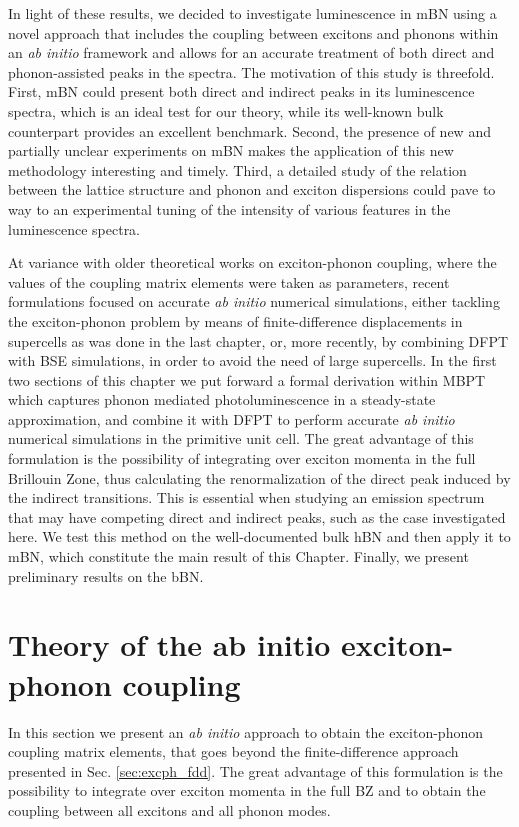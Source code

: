 In light of these results, we decided to investigate luminescence in mBN using a novel approach that includes the coupling between excitons and phonons within an \emph{ab initio} framework and allows for an accurate treatment of both direct and phonon-assisted peaks in the spectra.
The motivation of this study is threefold.
First, mBN could present both direct and indirect peaks in its luminescence spectra, which is an ideal test for our theory, while its well-known bulk counterpart provides an excellent benchmark.
Second, the presence of new and partially unclear experiments on \acrshort{mBN} makes the application of this new methodology interesting and timely.
Third, a detailed study of the relation between the lattice structure and phonon and exciton dispersions could pave to way to an experimental tuning of the intensity of various features in the luminescence spectra.  

At variance with older theoretical works on exciton-phonon coupling, where the values of the coupling matrix elements were taken as parameters, recent formulations focused on accurate \emph{ab initio} numerical simulations, either tackling the exciton-phonon problem by means of finite-difference displacements in supercells as was done in the last chapter, or, more recently, by combining \acrshort{DFPT} with \acrshort{BSE} simulations, in order to avoid the need of large supercells.\cite{chen2020exciton}
In the first two sections of this chapter we put forward a formal derivation within \acrshort{MBPT} which captures phonon mediated photoluminescence in a steady-state approximation, and combine it with \acrshort{DFPT} to perform accurate \emph{ab initio} numerical simulations in the primitive unit cell.
The great advantage of this formulation is the possibility of integrating over exciton momenta in the full Brillouin Zone, thus calculating the renormalization of the direct peak induced by the indirect transitions. This is essential when studying an emission spectrum that may have competing direct and indirect peaks, such as the case investigated here. We test this method on the well-documented bulk \acrshort{hBN} and then apply it to \acrshort{mBN}, which constitute the main result of this Chapter. Finally, we present preliminary results on the \acrshort{bBN}.

%
\section{Theory of the ab initio exciton-phonon coupling}
In this section we present an \textit{ab initio} approach to obtain the exciton-phonon coupling matrix elements, that goes beyond the finite-difference approach presented in Sec. \ref{sec:excph_fdd}. The great advantage of this formulation is the possibility to integrate over exciton momenta in the full \acrlong{BZ} and to obtain the coupling between all excitons and all phonon modes.\\

